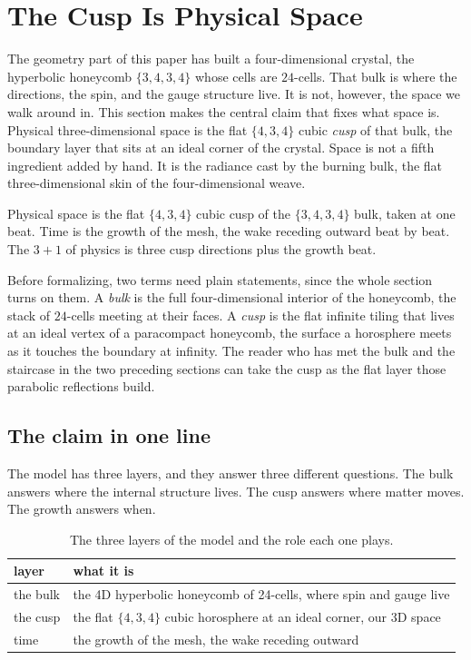 \section{The Cusp Is Physical Space}

The geometry part of this paper has built a four-dimensional crystal, the hyperbolic honeycomb $\{3,4,3,4\}$ whose cells are $24$-cells. That bulk is where the directions, the spin, and the gauge structure live. It is not, however, the space we walk around in. This section makes the central claim that fixes what space is. Physical three-dimensional space is the flat $\{4,3,4\}$ cubic \emph{cusp} of that bulk, the boundary layer that sits at an ideal corner of the crystal. Space is not a fifth ingredient added by hand. It is the radiance cast by the burning bulk, the flat three-dimensional skin of the four-dimensional weave.

\begin{principle}
Physical space is the flat $\{4,3,4\}$ cubic cusp of the $\{3,4,3,4\}$ bulk, taken at one beat. Time is the growth of the mesh, the wake receding outward beat by beat. The $3+1$ of physics is three cusp directions plus the growth beat.
\end{principle}

Before formalizing, two terms need plain statements, since the whole section turns on them. A \emph{bulk} is the full four-dimensional interior of the honeycomb, the stack of $24$-cells meeting at their faces. A \emph{cusp} is the flat infinite tiling that lives at an ideal vertex of a paracompact honeycomb, the surface a horosphere meets as it touches the boundary at infinity. The reader who has met the bulk and the staircase in the two preceding sections can take the cusp as the flat layer those parabolic reflections build.

\subsection{The claim in one line}

The model has three layers, and they answer three different questions. The bulk answers where the internal structure lives. The cusp answers where matter moves. The growth answers when.

\begin{table}[ht]
\centering
\begin{tabular}{@{}ll@{}}
\toprule
layer & what it is \\
\midrule
the bulk & the 4D hyperbolic honeycomb of 24-cells, where spin and gauge live \\
the cusp & the flat $\{4,3,4\}$ cubic horosphere at an ideal corner, our 3D space \\
time & the growth of the mesh, the wake receding outward \\
\bottomrule
\end{tabular}
\caption{The three layers of the model and the role each one plays.}
\label{tab:three-layers}
\end{table}

